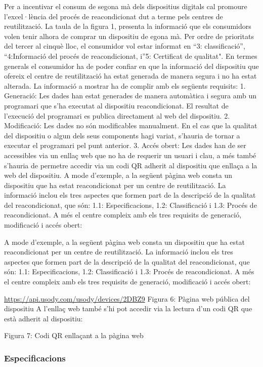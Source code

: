\documentclass[
]{book}
\begin{document}
Per a incentivar el consum de segona mà dels dispositius digitals cal promoure l'excel·lència del procés de reacondicionat dut a terme pels centres de reutilització. La taula de la figura 1, presenta la informació que els consumidors volen tenir alhora de comprar un dispositiu de egona mà. Per ordre de prioritats del tercer al cinquè lloc, el consumidor vol estar informat en ``3: classificació'', ``4:Informació del procés de reacondicionat, i''5: Certificat de qualitat". En termes generals el consumidor ha de poder confiar en que la informació del dispositiu que ofereix el centre de reutilització ha estat generada de manera segura i no ha estat alterada. La informació a mostrar ha de complir amb els següents requisits: 1. Generació: Les dades han estat generades de manera automàtica i segura amb un programari que s'ha executat al dispositiu reacondicionat. El resultat de l'execució del programari es publica directament al web del dispositiu. 2. Modificació: Les dades no són modificables manualment. En el cas que la qualitat del dispositiu o algun dels seus components hagi variat, s'hauria de tornar a executar el programari pel punt anterior. 3. Accés obert: Les dades han de ser accessibles via un enllaç web que no ha de requerir un usuari i clau, a més també s'hauria de permetre accedir via un codi QR adherit al dispositiu que enllaça a la web del dispositiu. A mode d'exemple, a la següent pàgina web consta un dispositiu que ha estat reacondicionat per un centre de reutilització. La informació inclou els tres aspectes que formen part de la descripció de la qualitat del reacondicionat, que són: 1.1: Especificacions, 1.2: Classificació i 1.3: Procés de reacondicionat. A més el centre compleix amb els tres requisits de generació, modificació i accés obert:

A mode d'exemple, a la següent pàgina web consta un dispositiu que ha estat reacondicionat per un centre de reutilització. La informació inclou els tres aspectes que formen part de la descripció de la qualitat del reacondicionat, que són: 1.1: Especificacions, 1.2: Classificació i 1.3: Procés de reacondicionat. A més el centre compleix amb els tres requisits de generació, modificació i accés obert:

\url{https://api.usody.com/usody/devices/2DBZ9} Figura 6: Pàgina web pública del dispositiu A l'enllaç web també s'hi pot accedir via la lectura d'un codi QR que està adherit al dispositiu:

Figura 7: Codi QR enllaçant a la pàgina web

\hypertarget{especificacions}{%
\subsubsection{Especificacions}\label{especificacions}}
\end{document}
